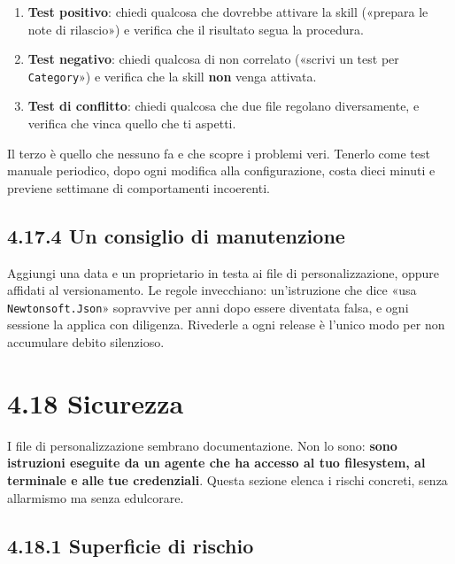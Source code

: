 \documentclass[
  italian,
  10pt,
]{book}
\providecommand{\tightlist}{%
  \setlength{\itemsep}{0pt}\setlength{\parskip}{0pt}}
\begin{document}
\begin{enumerate}
\def\labelenumi{\arabic{enumi}.}
\tightlist
\item
  \textbf{Test positivo}: chiedi qualcosa che dovrebbe attivare la skill
  («prepara le note di rilascio») e verifica che il risultato segua la
  procedura.
\item
  \textbf{Test negativo}: chiedi qualcosa di non correlato («scrivi un
  test per \texttt{Category}») e verifica che la skill \textbf{non}
  venga attivata.
\item
  \textbf{Test di conflitto}: chiedi qualcosa che due file regolano
  diversamente, e verifica che vinca quello che ti aspetti.
\end{enumerate}

Il terzo è quello che nessuno fa e che scopre i problemi veri. Tenerlo
come test manuale periodico, dopo ogni modifica alla configurazione,
costa dieci minuti e previene settimane di comportamenti incoerenti.

\subsection{4.17.4 Un consiglio di
manutenzione}\label{un-consiglio-di-manutenzione}

Aggiungi una data e un proprietario in testa ai file di
personalizzazione, oppure affidati al versionamento. Le regole
invecchiano: un'istruzione che dice «usa \texttt{Newtonsoft.Json}»
sopravvive per anni dopo essere diventata falsa, e ogni sessione la
applica con diligenza. Rivederle a ogni release è l'unico modo per non
accumulare debito silenzioso.

\section{4.18 Sicurezza}\label{sicurezza}

I file di personalizzazione sembrano documentazione. Non lo sono:
\textbf{sono istruzioni eseguite da un agente che ha accesso al tuo
filesystem, al terminale e alle tue credenziali}. Questa sezione elenca
i rischi concreti, senza allarmismo ma senza edulcorare.

\subsection{4.18.1 Superficie di rischio}\label{superficie-di-rischio}
\end{document}
